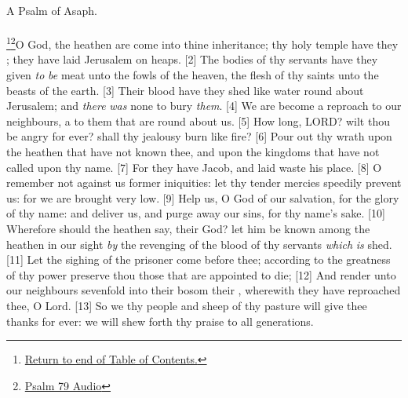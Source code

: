 \textcolor[cmyk]{0.99998,1,0,0}{A Psalm of Asaph.}\\
\\
\footnote{\textcolor[cmyk]{0.99998,1,0,0}{\hyperlink{TOC}{Return to end of Table of Contents.}}}\footnote{\href{https://audiobible.com/bible/psalms_79.html}{\textcolor[cmyk]{0.99998,1,0,0}{Psalm 79 Audio}}}\textcolor[cmyk]{0.99998,1,0,0}{O God, the heathen are come into thine inheritance; thy holy temple have they ; they have laid Jerusalem on heaps.}
[2] \textcolor[cmyk]{0.99998,1,0,0}{The  bodies of thy servants have they given \emph{to} \emph{be} meat unto the fowls of the heaven, the flesh of thy saints unto the beasts of the earth.}
[3] \textcolor[cmyk]{0.99998,1,0,0}{Their blood have they shed like water round about Jerusalem; and \emph{there} \emph{was} none to bury \emph{them}.}
[4] \textcolor[cmyk]{0.99998,1,0,0}{We are become a reproach to our neighbours, a  to them that are round about us.}
[5] \textcolor[cmyk]{0.99998,1,0,0}{How long, LORD? wilt thou be angry for ever? shall thy jealousy burn like fire?}
[6] \textcolor[cmyk]{0.99998,1,0,0}{Pour out thy wrath upon the heathen that have not known thee, and upon the kingdoms that have not called upon thy name.}
[7] \textcolor[cmyk]{0.99998,1,0,0}{For they have  Jacob, and laid waste his  place.}
[8] \textcolor[cmyk]{0.99998,1,0,0}{O remember not against us former iniquities: let thy tender mercies speedily prevent us: for we are brought very low.}
[9] \textcolor[cmyk]{0.99998,1,0,0}{Help us, O God of our salvation, for the glory of thy name: and deliver us, and purge away our sins, for thy name's sake.}
[10] \textcolor[cmyk]{0.99998,1,0,0}{Wherefore should the heathen say,  their God? let him be known among the heathen in our sight \emph{by} the revenging of the blood of thy servants \emph{which} \emph{is} shed.}
[11] \textcolor[cmyk]{0.99998,1,0,0}{Let the sighing of the prisoner come before thee; according to the greatness of thy power preserve thou those that are appointed to die;}
[12] \textcolor[cmyk]{0.99998,1,0,0}{And render unto our neighbours sevenfold into their bosom their , wherewith they have reproached thee, O Lord.}
[13] \textcolor[cmyk]{0.99998,1,0,0}{So we thy people and sheep of thy pasture will give thee thanks for ever: we will shew forth thy praise to all generations.}